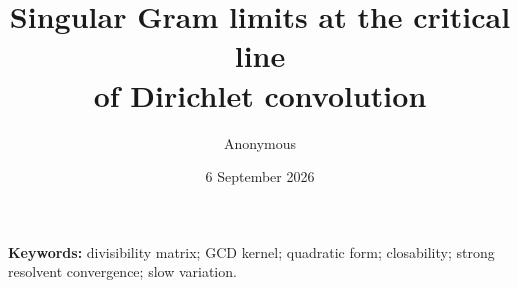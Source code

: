 \documentclass[11pt,a4paper]{article}
\title{Singular Gram limits at the critical line\\of Dirichlet convolution}
\author{Anonymous}
\date{6 September 2026}
\begin{document}
\maketitle
\begin{abstract}

\end{abstract}
\noindent\textbf{Keywords:} divisibility matrix; GCD kernel; quadratic form;
closability; strong resolvent convergence; slow variation.







\begingroup
\small


\endgroup
\end{document}
